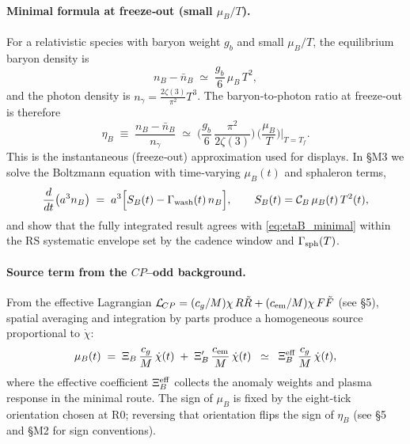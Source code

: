 \documentclass[11pt]{article}
\begin{document}
\paragraph{Minimal formula at freeze‑out (small \(\mu_B/T\)).}
For a relativistic species with baryon weight \(g_b\) and small \(\mu_B/T\), the equilibrium baryon density is
\begin{equation}
  n_B - \bar n_B \;\simeq\; \frac{g_b}{6}\,\mu_B\,T^2,
\end{equation}
and the photon density is \(n_\gamma = \tfrac{2\zeta(3)}{\pi^2}T^3\). The baryon‑to‑photon ratio at freeze‑out is therefore
\begin{equation}
  \eta_B \;\equiv\; \frac{n_B-\bar n_B}{n_\gamma}
  \;\simeq\;
  \Big(\frac{g_b}{6}\,\frac{\pi^2}{2\zeta(3)}\Big)\,
  \Big(\frac{\mu_B}{T}\Big)\Big|_{T=T_f}.
  \label{eq:etaB_minimal}
\end{equation}
This is the instantaneous (freeze‑out) approximation used for displays. In §M3 we solve the Boltzmann equation with time‑varying \(\mu_B(t)\) and sphaleron terms,
\begin{equation}
  \frac{d}{dt}\big(a^3 n_B\big)
  \;=\; a^3\Big[S_B(t) - \Gamma_{\rm wash}(t)\,n_B\Big],
  \qquad
  S_B(t)=\mathcal{C}_B\,\mu_B(t)\,T^2(t),
\end{equation}
and show that the fully integrated result agrees with \eqref{eq:etaB_minimal} within the RS systematic envelope set by the cadence window and \(\Gamma_{\rm sph}(T)\).

\paragraph{Source term from the \(CP\)–odd background.}
From the effective Lagrangian \(\mathcal{L}_{\!CP}=(c_g/M)\chi\,R\tilde R+(c_{\rm em}/M)\chi\,F\tilde F\) (see §5), spatial averaging and integration by parts produce a homogeneous source proportional to \(\dot\chi\):
\begin{equation}
  \mu_B(t) \;=\; \Xi_B\,\frac{c_g}{M}\,\dot\chi(t)\;+\;\Xi'_B\,\frac{c_{\rm em}}{M}\,\dot\chi(t)
  \;\; \simeq \;\; \Xi_B^{\rm eff}\,\frac{c_g}{M}\,\dot\chi(t),
  \label{eq:muB_source}
\end{equation}
where the effective coefficient \(\Xi_B^{\rm eff}\) collects the anomaly weights and plasma response in the minimal route. The sign of \(\mu_B\) is fixed by the eight‑tick orientation chosen at R0; reversing that orientation flips the sign of \(\eta_B\) (see §5 and §M2 for sign conventions). 
\end{document}
